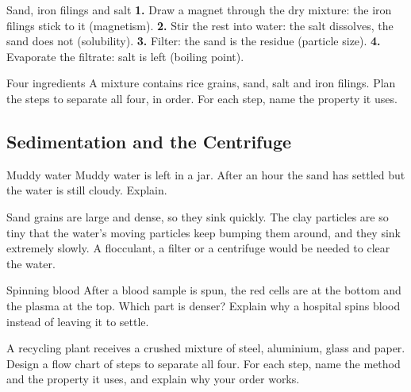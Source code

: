 \begin{workedex}{Sand, iron filings and salt}
\textbf{1.} Draw a magnet through the dry mixture: the iron filings stick to it (magnetism). \textbf{2.} Stir the rest into water: the salt dissolves, the sand does not (solubility). \textbf{3.} Filter: the sand is the residue (particle size). \textbf{4.} Evaporate the filtrate: salt is left (boiling point).
\end{workedex}

\begin{wedo}{Four ingredients}
A mixture contains rice grains, sand, salt and iron filings. Plan the steps to separate all four, in order. For each step, name the property it uses.
\answerbox{6cm}
\end{wedo}

\subsection{Sedimentation and the Centrifuge}\label{sub:a3.2}

\begin{workedex}{Muddy water}
Muddy water is left in a jar. After an hour the sand has settled but the water is still cloudy. Explain.

\smallskip
Sand grains are large and dense, so they sink quickly. The clay particles are so tiny that the water's moving particles keep bumping them around, and they sink extremely slowly. A flocculant, a filter or a centrifuge would be needed to clear the water.
\end{workedex}

\begin{wedo}{Spinning blood}
After a blood sample is spun, the red cells are at the bottom and the plasma at the top. Which part is denser? Explain why a hospital spins blood instead of leaving it to settle.
\answerbox{4.5cm}
\end{wedo}

\label{prac:3}


\label{ext:3}

\task A recycling plant receives a crushed mixture of steel, aluminium, glass and paper. Design a flow chart of steps to separate all four. For each step, name the method and the property it uses, and explain why your order works.
\answerbox{9cm}

\clearpage

\setcounter{section}{3}\renewcommand{\lessonart}{21}
\label{sec:4}

